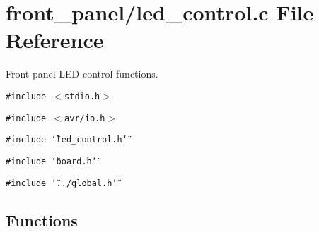 \section{front\_\-panel/led\_\-control.c File Reference}
\label{led__control_8c}
Front panel LED control functions.  


{\tt \#include $<$stdio.h$>$}\par
{\tt \#include $<$avr/io.h$>$}\par
{\tt \#include \char`\"{}led\_\-control.h\char`\"{}}\par
{\tt \#include \char`\"{}board.h\char`\"{}}\par
{\tt \#include \char`\"{}../global.h\char`\"{}}\par
\subsection*{Functions}

